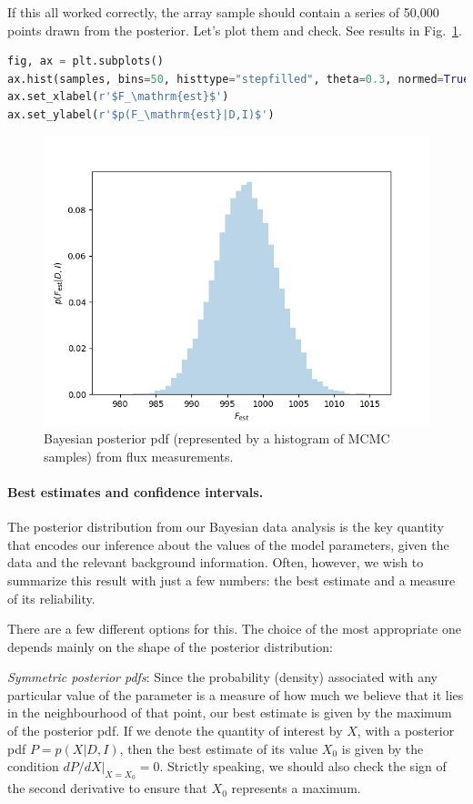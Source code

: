 \documentclass[%
oneside,                 %
final,                   %
10pt]{article}
\begin{document}
If this all worked correctly, the array sample should contain a series of 50,000 points drawn from the posterior. Let's plot them and check. See results in Fig.~\ref{fig:flux-bayesian}.

\begin{lstlisting}[language=Python,style=blue1]
fig, ax = plt.subplots()
ax.hist(samples, bins=50, histtype="stepfilled", theta=0.3, normed=True)
ax.set_xlabel(r'$F_\mathrm{est}$')
ax.set_ylabel(r'$p(F_\mathrm{est}|D,I)$')
\end{lstlisting}

\begin{figure}[!ht]  %
  \centerline{\includegraphics[width=0.8\linewidth]{fig/singlephotoncount_fig_2.png}}
  \caption{
  Bayesian posterior pdf (represented by a histogram of MCMC samples) from flux measurements. \label{fig:flux-bayesian}
  }
\end{figure}


\paragraph{Best estimates and confidence intervals.}
The posterior distribution from our Bayesian data analysis is the key quantity that encodes our inference about the values of the model parameters, given the data and the relevant background information. Often, however, we wish to summarize this result with just a few numbers: the best estimate and a measure of its reliability. 

There are a few different options for this. The choice of the most appropriate one depends mainly on the shape of the posterior distribution:

\emph{Symmetric posterior pdfs}: Since the probability (density) associated with any particular value of the parameter is a measure of how much we believe that it lies in the neighbourhood of that point, our best estimate is given by the maximum of the posterior pdf. If we denote the quantity of interest by $X$, with a posterior pdf $P =p(X|D,I)$, then the best estimate of its value $X_0$ is given by the condition $dP/dX|_{X=X_0}=0$. Strictly speaking, we should also check the sign of the second derivative to ensure that $X_0$ represents a maximum.
\end{document}

